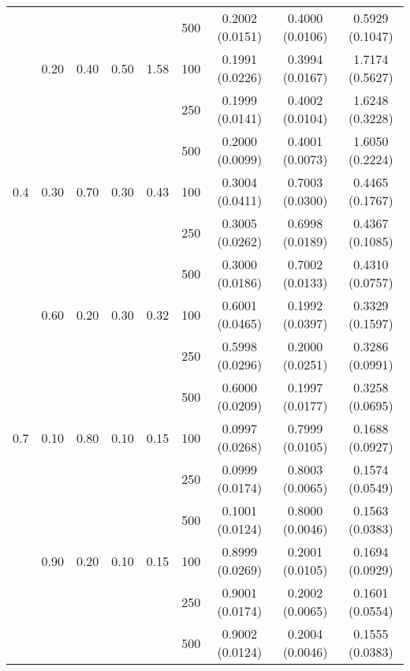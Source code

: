 \begin{small}
\begin{landscape}
\begin{longtable}{ccccccccc}
    &       &       &       &       &   500 &   0.2002 (0.0151) &   0.4000 (0.0106) &   0.5929 (0.1047) \\
    &   0.20    &   0.40    &   0.50    &   1.58    &   100 &   0.1991 (0.0226) &   0.3994 (0.0167) &   1.7174 (0.5627) \\
    &       &       &       &       &   250 &   0.1999 (0.0141) &   0.4002 (0.0104) &   1.6248 (0.3228) \\
    &       &       &       &       &   500 &   0.2000 (0.0099) &   0.4001 (0.0073) &   1.6050 (0.2224) \\\midrule
0.4 &   0.30    &   0.70    &   0.30    &   0.43    &   100 &   0.3004 (0.0411) &   0.7003 (0.0300) &   0.4465 (0.1767) \\
    &       &       &       &       &   250 &   0.3005 (0.0262) &   0.6998 (0.0189) &   0.4367 (0.1085) \\
    &       &       &       &       &   500 &   0.3000 (0.0186) &   0.7002 (0.0133) &   0.4310 (0.0757) \\
    &   0.60    &   0.20    &   0.30    &   0.32    &   100 &   0.6001 (0.0465) &   0.1992 (0.0397) &   0.3329 (0.1597) \\
    &       &       &       &       &   250 &   0.5998 (0.0296) &   0.2000 (0.0251) &   0.3286 (0.0991) \\
    &       &       &       &       &   500 &   0.6000 (0.0209) &   0.1997 (0.0177) &   0.3258 (0.0695) \\\midrule
0.7 &   0.10    &   0.80    &   0.10    &   0.15    &   100 &   0.0997 (0.0268) &   0.7999 (0.0105) &   0.1688 (0.0927) \\
    &       &       &       &       &   250 &   0.0999 (0.0174) &   0.8003 (0.0065) &   0.1574 (0.0549) \\
    &       &       &       &       &   500 &   0.1001 (0.0124) &   0.8000 (0.0046) &   0.1563 (0.0383) \\
    &   0.90    &   0.20    &   0.10    &   0.15    &   100 &   0.8999 (0.0269) &   0.2001 (0.0105) &   0.1694 (0.0929) \\
    &       &       &       &       &   250 &   0.9001 (0.0174) &   0.2002 (0.0065) &   0.1601 (0.0554) \\
    &       &       &       &       &   500 &   0.9002 (0.0124) &   0.2004 (0.0046) &   0.1555 (0.0383) \\
\bottomrule
\end{longtable}
\end{landscape}
\end{small}
\enlargethispage{10pt}




%
